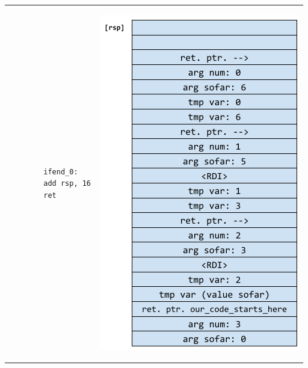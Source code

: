 \documentclass[letterpaper]{article}
\begin{document}
\begin{center}
\begin{tabular}{p{3in} p{3in}}
\begin{verbatim}
        ifend_0:
        add rsp, 16
        ret\end{verbatim}
        & \begin{center}
            \includegraphics[scale=0.6]{../assets/tail_rec_diagram.png}
        \end{center}
    \end{tabular}
\end{center}
\end{document}
